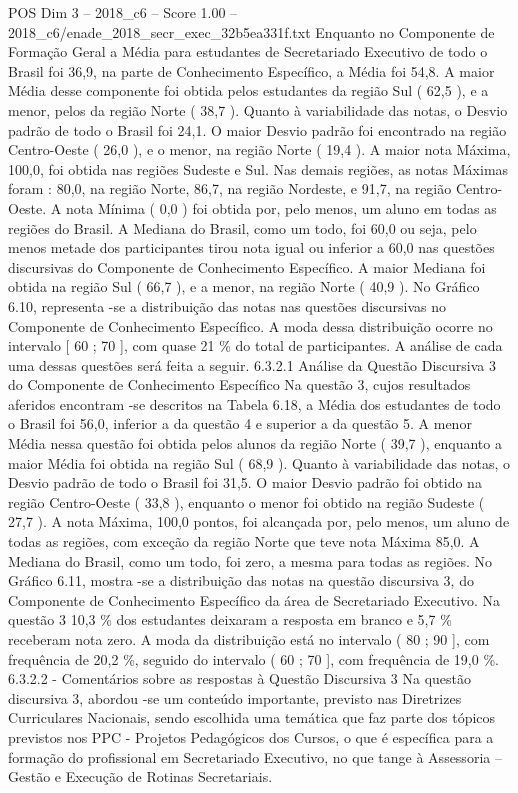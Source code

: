 \begin{textsample}{POS Dim 3 – 2018\_c6 – Score 1.00 – 2018\_c6/enade\_2018\_secr\_exec\_32b5ea331f.txt}
Enquanto no Componente de Formação Geral a Média para estudantes de Secretariado Executivo de todo o Brasil foi 36,9, na parte de Conhecimento Específico, a Média foi 54,8.
A maior Média desse componente foi obtida pelos estudantes da região Sul ( 62,5 ), e a menor, pelos da região Norte ( 38,7 ).
Quanto à variabilidade das notas, o Desvio padrão de todo o Brasil foi 24,1.
O maior Desvio padrão foi encontrado na região Centro-Oeste ( 26,0 ), e o menor, na região Norte ( 19,4 ).
A maior nota Máxima, 100,0, foi obtida nas regiões Sudeste e Sul.
Nas demais regiões, as notas Máximas foram : 80,0, na região Norte, 86,7, na região Nordeste, e 91,7, na região Centro-Oeste.
A nota Mínima ( 0,0 ) foi obtida por, pelo menos, um aluno em todas as regiões do Brasil.
A Mediana do Brasil, como um todo, foi 60,0 ou seja, pelo menos metade dos participantes tirou nota igual ou inferior a 60,0 nas questões discursivas do Componente de Conhecimento Específico.
A maior Mediana foi obtida na região Sul ( 66,7 ), e a menor, na região Norte ( 40,9 ).
No Gráfico 6.10, representa -se a distribuição das notas nas questões discursivas no Componente de Conhecimento Específico.
A moda dessa distribuição ocorre no intervalo [ 60 ; 70 ], com quase 21 \% do total de participantes.
A análise de cada uma dessas questões será feita a seguir. 6.3.2.1 Análise da Questão Discursiva 3 do Componente de Conhecimento Específico Na questão 3, cujos resultados aferidos encontram -se descritos na Tabela 6.18, a Média dos estudantes de todo o Brasil foi 56,0, inferior a da questão 4 e superior a da questão 5.
A menor Média nessa questão foi obtida pelos alunos da região Norte ( 39,7 ), enquanto a maior Média foi obtida na região Sul ( 68,9 ).
Quanto à variabilidade das notas, o Desvio padrão de todo o Brasil foi 31,5.
O maior Desvio padrão foi obtido na região Centro-Oeste ( 33,8 ), enquanto o menor foi obtido na região Sudeste ( 27,7 ).
A nota Máxima, 100,0 pontos, foi alcançada por, pelo menos, um aluno de todas as regiões, com exceção da região Norte que teve nota Máxima 85,0.
A Mediana do Brasil, como um todo, foi zero, a mesma para todas as regiões.
No Gráfico 6.11, mostra -se a distribuição das notas na questão discursiva 3, do Componente de Conhecimento Específico da área de Secretariado Executivo.
Na questão 3 10,3 \% dos estudantes deixaram a resposta em branco e 5,7 \% receberam nota zero.
A moda da distribuição está no intervalo ( 80 ; 90 ], com frequência de 20,2 \%, seguido do intervalo ( 60 ; 70 ], com frequência de 19,0 \%. 6.3.2.2 - Comentários sobre as respostas à Questão Discursiva 3 Na questão discursiva 3, abordou -se um conteúdo importante, previsto nas Diretrizes Curriculares Nacionais, sendo escolhida uma temática que faz parte dos tópicos previstos nos PPC - Projetos Pedagógicos dos Cursos, o que é específica para a formação do profissional em Secretariado Executivo, no que tange à Assessoria – Gestão e Execução de Rotinas Secretariais.

\end{textsample}
